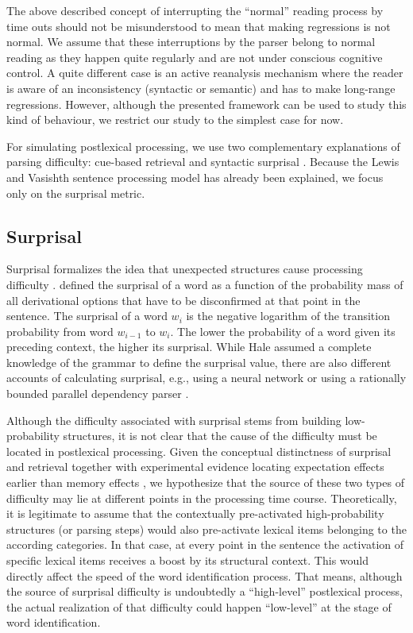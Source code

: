 \documentclass{cambridge7A}\usepackage[]{graphicx}\usepackage[]{color}
\begin{document}
The above described concept of interrupting the ``normal'' reading process by time outs should not be misunderstood to mean that making regressions is not normal.  We assume that these interruptions by the parser belong to normal reading as they happen quite regularly and are not under conscious cognitive control.  A quite different case is an active reanalysis mechanism  where the reader is aware of an inconsistency (syntactic or semantic) and has to make long-range regressions.  However, although the presented framework can be used to study this kind of behaviour, we restrict our study to the simplest case for now.

For simulating postlexical processing, we use two complementary explanations of parsing difficulty: cue-based retrieval \citep{LewisVasishth2005} and  syntactic surprisal \citep{Hale2001,Levy2008}. Because the Lewis and Vasishth sentence processing model has already been explained, we focus only on the surprisal metric. 

\subsection{Surprisal}
Surprisal \citep{Hale2001,Levy2008} formalizes the idea that unexpected structures cause processing difficulty \citep{Konieczny2000}. \cite{Hale2001} defined the surprisal of a word as a function of the probability mass of all derivational options that have to be disconfirmed at that point in the sentence.
The surprisal of a word $w_i$ is the negative logarithm of the transition probability from word $w_{i-1}$ to $w_i$. The lower the probability of a word given its preceding context, the higher its surprisal. While Hale assumed a complete knowledge of the grammar to define the surprisal value, there are also different accounts of calculating surprisal, e.g., using a neural network \citep{Frank2009} or using a rationally bounded parallel dependency parser \citep{BostonHaleVasishth2011}.

Although the difficulty associated with surprisal stems from building low-probability structures, it is not clear that the cause of the difficulty must be located in postlexical processing.
Given the conceptual distinctness of surprisal and retrieval together with experimental evidence locating expectation effects earlier than memory effects \citep{Staub2010a,Vasishth2011}, we hypothesize that the source of these two types of difficulty may lie at different points in the processing time course.
Theoretically, it is legitimate to assume that the contextually pre-activated high-probability structures (or parsing steps) would also pre-activate lexical items belonging to the according categories. In that case, at every point in the sentence the activation of specific lexical items receives a boost by its structural context. This would directly affect the speed of the word identification process.
That means, although the source of surprisal difficulty is undoubtedly a ``high-level'' postlexical process, the actual realization of that difficulty could happen ``low-level'' at the stage of word identification.
\end{document}
